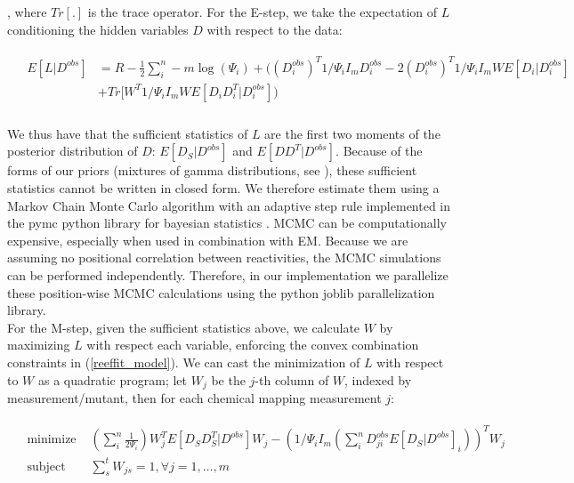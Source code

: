 \documentclass[12pt]{article}
\begin{document}
, where $Tr[.]$ is the trace operator. For the E-step, we take the expectation of $L$ conditioning the hidden variables $D$ with respect to the data:

\begin{align}
  &\begin{aligned}
    E[L| D^{obs}] &=  R -\frac{1}{2}\sum^n_i -m\log(\Psi_{i})	 + ((D^{obs}_i)^T1/\Psi_{i}I_{m}D^{obs}_i - 2(D^{obs}_i)^T 1/\Psi_{i}I_{m} WE[D_{i}|D^{obs}_i]\\ 
    & + Tr[W^T 1/\Psi_{i}I_{m} WE[D_{i}D_{i}^T|D^{obs}_i])\\
   \end{aligned}
\end{align}

We thus have that the sufficient statistics of $L$ are the first two moments of the posterior distribution of $D$: $E[D_S | D^{obs}]$ and $E[DD^T | D^{obs}]$. 
Because of the forms of our priors (mixtures of gamma distributions, see \cite{Cordero2012a}), these sufficient statistics cannot be written in closed form. 
We therefore estimate them using a Markov Chain Monte Carlo algorithm with an adaptive step rule implemented in the pymc python library for bayesian statistics \cite{Patil2010}. 
MCMC can be computationally expensive, especially when used in combination with EM. 
Because we are assuming no positional correlation between reactivities, the MCMC simulations can be performed independently. 
Therefore, in our implementation we parallelize these position-wise MCMC calculations using the python joblib parallelization library.\\
For the M-step, given the sufficient statistics above, we calculate $W$ by maximizing $L$ with respect each variable, enforcing the convex combination constraints in (\ref{reeffit_model}). 
We can cast the minimization of $L$ with respect to $W$ as a quadratic program;	 let $W_j$ be the $j$-th column of $W$, indexed by measurement/mutant, then for each chemical mapping measurement $j$:


\begin{align}
  &\begin{aligned}\label{W_qp}
   \mbox{minimize } &(\sum_i^n \frac{1}{2\Psi_{i}})W_j^TE[D_SD_S^T | D^{obs}]W_j - (1/\Psi_{i}I_{m}(\sum_i^n D^{obs}_{ji}E[D_S | D^{obs}]_i))^TW_j\\
   \mbox{subject to } & \sum_{s}^{t} W_{js} = 1, \forall j = 1, …, m
   \end{aligned}
\end{align}
 
\end{document}
